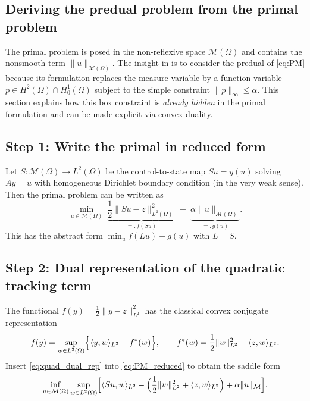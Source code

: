 \documentclass[11pt,a4paper]{article}
\begin{document}
\subsection{Deriving the predual problem from the primal problem}\label{sec:derive_predual}

The primal problem is posed in the non-reflexive space $\mathcal{M}(\Omega)$ and contains
the nonsmooth term $\|u\|_{\mathcal{M}(\Omega)}$. The insight in \cite{ClasonKunisch2009} is to consider the predual of \ref{eq:PM} because its formulation replaces the measure variable
by a function variable $p\in H^2(\Omega)\cap H^1_0(\Omega)$ subject to the simple constraint
$\|p\|_\infty\le \alpha$. This section explains how this box constraint is \emph{already hidden}
in the primal formulation and can be made explicit via convex duality.

\subsection*{Step 1: Write the primal in reduced form}
Let $S:\mathcal{M}(\Omega)\to L^2(\Omega)$ be the control-to-state map $Su=y(u)$ solving
$Ay=u$ with homogeneous Dirichlet boundary condition (in the very weak sense).
Then the primal problem can be written as
\begin{equation}\label{eq:PM_reduced}
\min_{u\in\mathcal{M}(\Omega)} \;
\underbrace{\frac12\|Su-z\|_{L^2(\Omega)}^2}_{=:f(Su)}
\;+\;
\underbrace{\alpha\|u\|_{\mathcal{M}(\Omega)}}_{=:g(u)}.
\end{equation}
This has the abstract form $\min_{u} f(Lu)+g(u)$ with $L=S$.

\subsection*{Step 2: Dual representation of the quadratic tracking term}
The functional $f(y)=\frac12\|y-z\|_{L^2}^2$ has the classical convex conjugate representation \cite{ekelandtemam1999}
\begin{equation}\label{eq:quad_dual_rep}
f(y)=\sup_{w\in L^2(\Omega)}\Bigl\{\langle y,w\rangle_{L^2}-f^*(w)\Bigr\},
\qquad
f^*(w)=\frac12\|w\|_{L^2}^2+\langle z,w\rangle_{L^2}.
\end{equation}
Insert \eqref{eq:quad_dual_rep} into \eqref{eq:PM_reduced} to obtain the saddle form
\begin{equation}\label{eq:saddle_start}
\inf_{u\in\mathcal{M}(\Omega)}\sup_{w\in L^2(\Omega)}
\Bigl[
\langle Su,w\rangle_{L^2}
-\Bigl(\frac12\|w\|_{L^2}^2+\langle z,w\rangle_{L^2}\Bigr)
+\alpha\|u\|_{\mathcal{M}}
\Bigr].
\end{equation}
\end{document}

